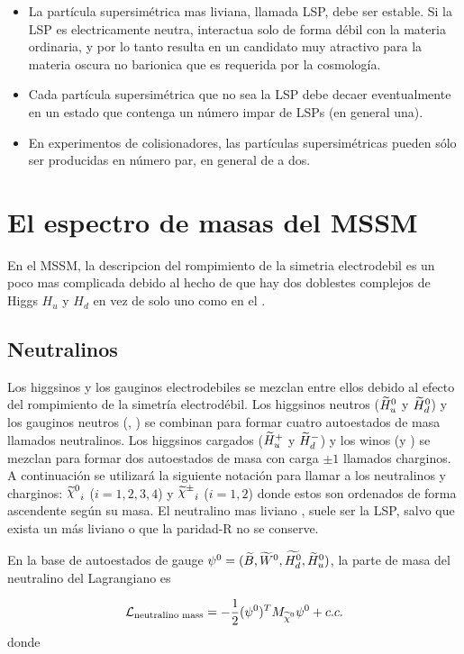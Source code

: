 \begin{itemize}
\item La partícula supersimétrica mas liviana, llamada LSP, debe ser estable. Si la LSP es
  electricamente neutra, interactua solo de forma débil con la materia ordinaria, y por lo tanto
  resulta en un candidato muy atractivo para la materia oscura no barionica que es requerida por
  la cosmología.
\item Cada partícula supersimétrica que no sea la LSP debe decaer eventualmente en un estado que
  contenga un número impar de LSPs (en general una).
\item En experimentos de colisionadores, las partículas supersimétricas pueden sólo ser producidas
  en número par, en general de a dos.
\end{itemize}


\section{El espectro de masas del MSSM}

En el MSSM, la descripcion del rompimiento de la simetria electrodebil es un poco
mas complicada debido al hecho de que hay dos doblestes complejos de Higgs $H_u$
y $H_d$ en vez de solo uno como en el {\SM}.

\subsection{Neutralinos}
Los higgsinos y los gauginos electrodebiles se mezclan entre ellos debido al efecto del
rompimiento de la simetría electrodébil. Los higgsinos neutros ($\widetilde{H}_u^0$ y
$\widetilde{H}_d^0$) y los gauginos neutros (\bino, \winozero) se combinan para formar cuatro
autoestados de masa llamados neutralinos. Los higgsinos cargados ($\widetilde{H}_u^+$ y
$\widetilde{H}_d^-$) y los winos (\winop y \winom) se mezclan para formar dos autoestados de
masa con carga $\pm 1$ llamados charginos. A continuación se utilizará la siguiente
notación para llamar a los neutralinos y charginos:
${\nino}_{i}$ ($i=1,2,3,4$) y ${\chinopm}_{i}$ ($i=1,2$) donde estos son ordenados de
forma ascendente según su masa. El neutralino mas liviano {\ninoone}, suele ser la LSP,
salvo que exista un {\gravino} más liviano o que la paridad-R no se conserve.

En la base de autoestados de gauge $\psi^0 = (\widetilde{B}, \widetilde{W}^0, \widetilde{H_d^0}, \widetilde{H}_u^0)$,
la parte de masa del neutralino del Lagrangiano es

\begin{equation}
  \mathcal{L}_\text{neutralino mass} = -\frac{1}{2} (\psi^0)^T M_{\nino} \psi^0 + c.c.
\end{equation}
%
donde

